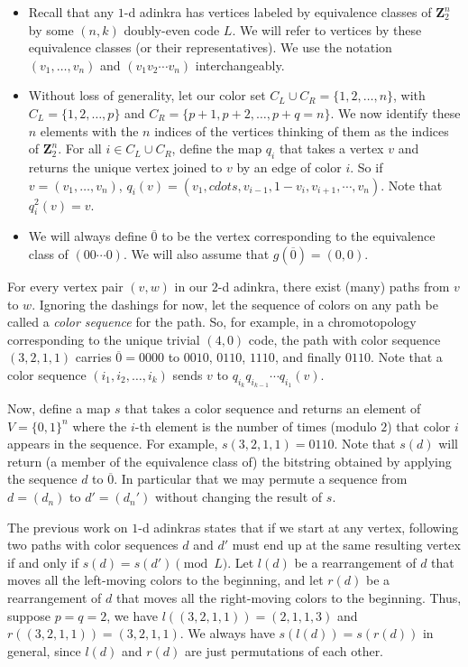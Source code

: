 \documentclass[12pt,twoside,singlespace]{article}
\numberwithin{equation}{section}
\theoremstyle{definition}
\newcommand{\ZZ}{\mathbf{Z}}
\begin{document}
\begin{itemize}
\item Recall that any $1$-d adinkra has vertices labeled by equivalence classes of $\ZZ_2^n$ by some $(n,k)$ doubly-even code $L$. We will refer to vertices by these equivalence classes (or their representatives). We use the notation $(v_1, \ldots, v_n)$ and $(v_1 v_2 \cdots v_n)$ interchangeably.
\item Without loss of generality, let our color set $C_L \cup C_R = \{1,2,\ldots, n\}$, with $C_L = \{1, 2, \ldots, p\}$ and $C_R = \{p+1, p+2, \ldots, p+q=n\}$. We now identify these $n$ elements with the $n$ indices of the vertices thinking of them as the indices of $\ZZ_2^n$. For all $i \in C_L \cup C_R$, define the map $q_i$ that takes a vertex $v$ and returns the unique vertex joined to $v$ by an edge of color $i$. So if $v = (v_1, \ldots, v_n)$, $q_i(v) = (v_1, cdots, v_{i-1}, 1-v_i, v_{i+1}, \cdots, v_n)$. Note that $q_i^2(v) = v$.
\item We will always define $\overline{0}$ to be the vertex corresponding to the equivalence class of $(00\cdots0)$. We will also assume that $g(\overline{0}) = (0,0)$. 
\end{itemize}

For every vertex pair $(v,w)$ in our $2$-d adinkra, there exist (many) paths from $v$ to $w$. Ignoring the dashings for now, let the sequence of colors on any path be called a \emph{color sequence} for the path. So, for example, in a chromotopology corresponding to the unique trivial $(4,0)$ code, the path with color sequence $(3,2,1,1)$ carries $\overline{0} = 0000$ to $0010$, $0110$, $1110$, and finally $0110$. Note that a color sequence $(i_1, i_2, \ldots, i_k)$ sends $v$ to $q_{i_k} q_{i_{k-1}} \cdots q_{i_1} (v)$.

Now, define a map $s$ that takes a color sequence and returns an element of $V = \{0,1\}^n$ where the $i$-th element is the number of times (modulo $2$) that color $i$ appears in the sequence. For example, $s(3,2,1,1) = 0110$. Note that $s(d)$ will return (a member of the equivalence class of) the bitstring obtained by applying the sequence $d$ to $\overline{0}$.  In particular that we may permute a sequence from $d = (d_n)$ to $d' = (d_n')$ without changing the result of $s$. 

The previous work on $1$-d adinkras states that if we start at any vertex, following two paths with color sequences $d$ and $d'$ must end up at the same resulting vertex if and only if $s(d) = s(d') \pmod{L}$. Let $l(d)$ be a rearrangement of $d$ that moves all the left-moving colors to the beginning, and let $r(d)$ be a rearrangement of $d$ that moves all the right-moving colors to the beginning. Thus, suppose $p = q = 2$, we have $l((3,2,1,1)) = (2,1,1,3)$ and $r((3,2,1,1)) = (3,2,1,1)$. We always have $s(l(d)) = s(r(d))$ in general, since $l(d)$ and $r(d)$ are just permutations of each other.
\end{document}
